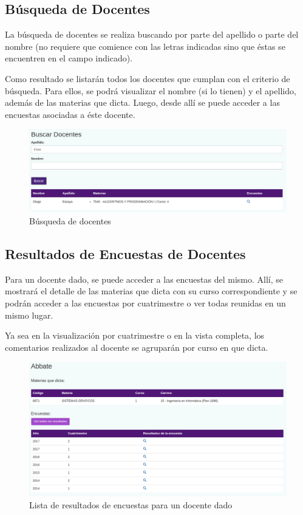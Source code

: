 \documentclass[a4paper]{article}
\begin{document}
\subsection{Búsqueda de Docentes}

La búsqueda de docentes se realiza buscando por parte del apellido o parte del nombre (no requiere que comience con las letras indicadas sino que éstas se encuentren en el campo indicado).

Como resultado se listarán todos los docentes que cumplan con el criterio de búsqueda. Para ellos, se podrá visualizar el nombre (si lo tienen) y el apellido, además de las materias que dicta. Luego, desde allí se puede acceder a las encuestas asociadas a éste docente.

\begin{figure}[H]
\centering
\includegraphics[scale=0.3]{Imagenes/buscar_docentes.png}\par
\caption{Búsqueda de docentes}
\end{figure}

\subsection{Resultados de Encuestas de Docentes}

Para un docente dado, se puede acceder a las encuestas del mismo. Allí, se mostrará el detalle de las materias que dicta con su curso correspondiente y se podrán acceder a las encuestas por cuatrimestre o ver todas reunidas en un mismo lugar.

Ya sea en la visualización por cuatrimestre o en la vista completa, los comentarios realizados al docente se agruparán por curso en que dicta.

\begin{figure}[H]
\centering
\includegraphics[scale=0.35]{Imagenes/resultados_encuesta_docente.png}\par
\caption{Lista de resultados de encuestas para un docente dado}
\end{figure}
\end{document}

